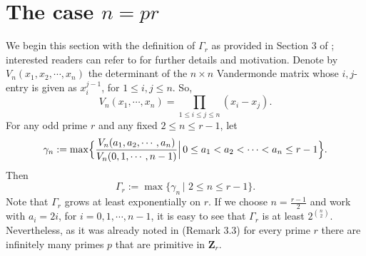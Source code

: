 \documentclass[a4paper,12pt,reqno]{amsart}
\def\Z{\mathbf{Z}}
\begin{document}
\section{ The case $n=pr $  }\label{Sec:n=pr}

We begin this section  with the definition of $\Gamma_r$ as provided in Section 3 of \cite{Zhang}; interested readers can refer to \cite{Zhang} for further details and motivation.
Denote by $V_n(x_1, x_2, \cdots, x_n)$ the  determinant of the $n\times n$ Vandermonde matrix whose $i, j$-entry is given as $x_i^{j-1}$,  for $1 \leq i, j \leq n$. So, 
\[
V_n(x_1, \cdots, x_n)= \prod_{1 \leq i \leq j \leq n} (x_i - x_j).
\]
For any odd prime $r$ and any  fixed $2 \leq n \leq r-1$, let 
\[
\gamma_n:= \max \Bigl\{ \frac{V_n(a_1, a_2, \cdots, a_n)}{V_n(0,1,\cdots,n-1) } \Big| \, 0 \leq a_1 <a_2 < \cdots <a_n \leq r-1 \Bigr\}.
\]
Then 
\[
\Gamma_r := \max \big\{ \gamma_n \, \big|  \, \, 2 \leq n \leq r-1 \big\}.
\]
Note that $\Gamma_r$ grows at least exponentially on $r$. If we choose $n=\frac{r-1}{2}$ and work with $a_i = 2i$,  for $i=0,1, \cdots  , n-1$,  
it is easy to see that $\Gamma_r$ is at least $2^{n \choose 2}$.
Nevertheless, as it was already noted in \cite{Zhang} (Remark 3.3)   for every prime $r$ there are infinitely many primes $p$ that are primitive in $\Z_r$. 
\end{document}

